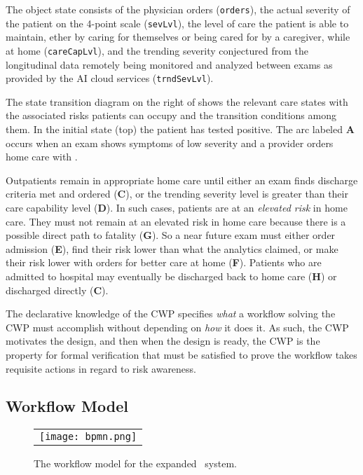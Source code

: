 The object state consists of the physician orders (\texttt{orders}), the actual severity of the patient on the 4-point scale (\texttt{sevLvl}), the level of care the patient is able to maintain, ether by caring for themselves or being cared for by a caregiver, while at home (\texttt{careCapLvl}), and the trending severity conjectured from the longitudinal data remotely being monitored and analyzed between exams as provided by the AI cloud services (\texttt{trndSevLvl}).

The state transition diagram on the right of  shows the relevant care states with the associated risks patients can occupy and the transition conditions among them. In the initial state (top) the patient has tested positive. The arc labeled \textbf{A} occurs when an exam shows symptoms of low severity and a provider orders home care with \phware. 

Outpatients remain in appropriate home care until either an exam finds discharge criteria met and ordered (\textbf{C}), or the trending severity level is greater than their care capability level (\textbf{D}). In such cases, patients are at an \emph{elevated risk} in home care. They must not remain at an elevated risk in home care because there is a possible direct path to fatality (\textbf{G}). So a near future exam must either order admission (\textbf{E}), find their risk lower than what the analytics claimed, or make their risk lower with orders for better care at home (\textbf{F}). Patients who are admitted to hospital may eventually be discharged back to home care (\textbf{H}) or discharged directly (\textbf{C}). 

The declarative knowledge of the CWP specifies \emph{what} a workflow solving the CWP must accomplish without depending on \emph{how} it does it. As such, the CWP motivates the design, and then when the design is ready, the CWP is the property for formal verification that must be satisfied to prove the workflow takes requisite actions in regard to risk awareness.

\subsection{Workflow Model}
\begin{figure*}
  \begin{center}
    \begin{tabular}{c}
      \texttt{[image: bpmn.png]}
    \end{tabular}
  \end{center}
\caption{The workflow model for the expanded \phware\ system.}
\label{fig:bpmn}
\end{figure*}

